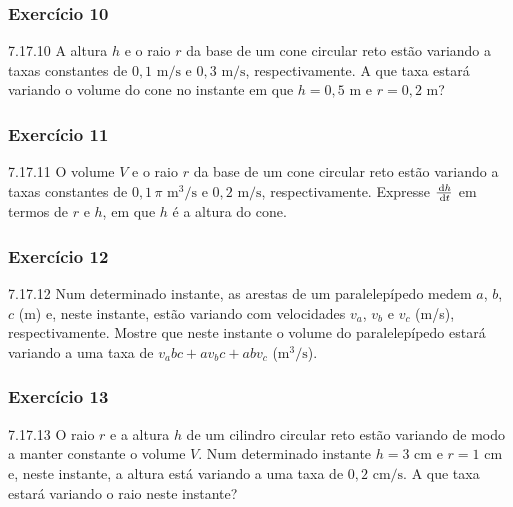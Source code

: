 \subsubsection*{Exercício 10}
\begin{exercicio}[10]{7.17.10}
A altura $h$ e o raio $r$ da base de um cone circular reto estão variando a taxas constantes de $0{,}1\text{ m/s}$ e $0{,}3\text{ m/s}$, respectivamente. A que taxa estará variando o volume do cone no instante em que $h = 0{,}5\text{ m}$ e $r = 0{,}2\text{ m}$?
\end{exercicio}

\subsubsection*{Exercício 11}
\begin{exercicio}[11]{7.17.11}
O volume $V$ e o raio $r$ da base de um cone circular reto estão variando a taxas constantes de $0{,}1\,\pi\text{ m}^3\text{/s}$ e $0{,}2\text{ m/s}$, respectivamente. Expresse $\frac{\,\mathrm{d} h}{\,\mathrm{d} t}$ em termos de $r$ e $h$, em que $h$ é a altura do cone.
\end{exercicio}

\subsubsection*{Exercício 12}
\begin{exercicio}[12]{7.17.12}
Num determinado instante, as arestas de um paralelepípedo medem $a$, $b$, $c$ (m) e, neste instante, estão variando com velocidades $v_a$, $v_b$ e $v_c$ (m/s), respectivamente. Mostre que neste instante o volume do paralelepípedo estará variando a uma taxa de $v_a bc + a v_b c + ab v_c$ ($\text{m}^3\text{/s}$).
\end{exercicio}

\subsubsection*{Exercício 13}
\begin{exercicio}[13]{7.17.13}
O raio $r$ e a altura $h$ de um cilindro circular reto estão variando de modo a manter constante o volume $V$. Num determinado instante $h = 3\text{ cm}$ e $r = 1\text{ cm}$ e, neste instante, a altura está variando a uma taxa de $0{,}2\text{ cm/s}$. A que taxa estará variando o raio neste instante?
\end{exercicio}


